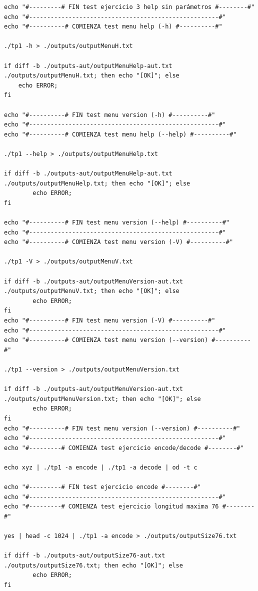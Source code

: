 \documentclass[11pt,a4paper]{article}
\begin{document}
\begin{lstlisting}
echo "#---------# FIN test ejercicio 3 help sin parámetros #--------#"
echo "#-----------------------------------------------------#"
echo "#----------# COMIENZA test menu help (-h) #----------#"

./tp1 -h > ./outputs/outputMenuH.txt

if diff -b ./outputs-aut/outputMenuHelp-aut.txt ./outputs/outputMenuH.txt; then echo "[OK]"; else
	echo ERROR;
fi

echo "#----------# FIN test menu version (-h) #----------#"
echo "#-----------------------------------------------------#"
echo "#----------# COMIENZA test menu help (--help) #----------#"

./tp1 --help > ./outputs/outputMenuHelp.txt

if diff -b ./outputs-aut/outputMenuHelp-aut.txt ./outputs/outputMenuHelp.txt; then echo "[OK]"; else
		echo ERROR;
fi

echo "#----------# FIN test menu version (--help) #----------#"
echo "#-----------------------------------------------------#"
echo "#----------# COMIENZA test menu version (-V) #----------#"

./tp1 -V > ./outputs/outputMenuV.txt

if diff -b ./outputs-aut/outputMenuVersion-aut.txt ./outputs/outputMenuV.txt; then echo "[OK]"; else
		echo ERROR;
fi
echo "#----------# FIN test menu version (-V) #----------#"
echo "#-----------------------------------------------------#"
echo "#----------# COMIENZA test menu version (--version) #----------#"

./tp1 --version > ./outputs/outputMenuVersion.txt

if diff -b ./outputs-aut/outputMenuVersion-aut.txt ./outputs/outputMenuVersion.txt; then echo "[OK]"; else
		echo ERROR;
fi
echo "#----------# FIN test menu version (--version) #----------#"
echo "#-----------------------------------------------------#"
echo "#---------# COMIENZA test ejercicio encode/decode #--------#"

echo xyz | ./tp1 -a encode | ./tp1 -a decode | od -t c

echo "#---------# FIN test ejercicio encode #--------#"
echo "#-----------------------------------------------------#"
echo "#---------# COMIENZA test ejercicio longitud maxima 76 #--------#"

yes | head -c 1024 | ./tp1 -a encode > ./outputs/outputSize76.txt

if diff -b ./outputs-aut/outputSize76-aut.txt ./outputs/outputSize76.txt; then echo "[OK]"; else
		echo ERROR;
fi


\end{lstlisting}
\end{document}
